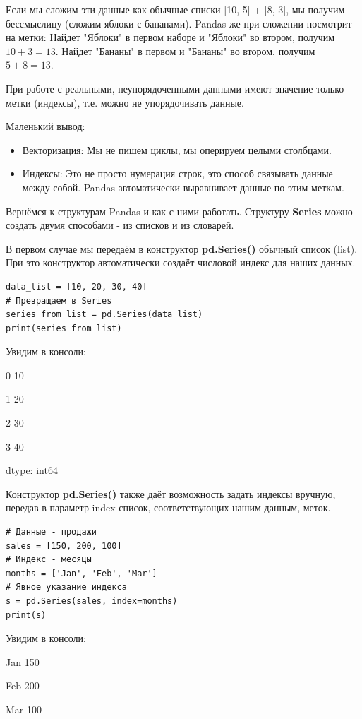 \documentclass[pract]{SCWorks}
\begin{document}
Если мы сложим эти данные как обычные списки [10, 5] + [8, 3], мы получим бессмыслицу 
(сложим яблоки с бананами). Pandas же при сложении посмотрит на метки:
Найдет "Яблоки" в первом наборе и "Яблоки" во втором, получим $10+3=13$.
Найдет "Бананы" в первом и "Бананы" во втором, получим $5+8=13$.

При работе с реальными, неупорядоченными данными имеют значение только метки (индексы), т.е. 
можно не упорядочивать данные.

Маленький вывод:

\begin{itemize}
    \item Векторизация: Мы не пишем циклы, мы оперируем целыми столбцами.
    \item Индексы: Это не просто нумерация строк, это способ связывать данные между собой. 
    Pandas автоматически выравнивает данные по этим меткам.
\end{itemize}

Вернёмся к структурам Pandas и как с ними работать.
Структуру \textbf{Series} можно создать двумя способами - из списков и из словарей.

В первом случае мы передаём в конструктор \textbf{pd.Series()} обычный список (list). При это 
конструктор автоматически создаёт числовой индекс для наших данных.

\begin{verbatim}
data_list = [10, 20, 30, 40]
# Превращаем в Series
series_from_list = pd.Series(data_list)
print(series_from_list)
\end{verbatim}
Увидим в консоли:

0   10

1   20

2   30

3   40

dtype: int64

Конструктор \textbf{pd.Series()} также даёт возможность задать индексы вручную, передав в параметр index
список, соответствующих нашим данным, меток.

\begin{verbatim}
# Данные - продажи
sales = [150, 200, 100]
# Индекс - месяцы
months = ['Jan', 'Feb', 'Mar']
# Явное указание индекса
s = pd.Series(sales, index=months)
print(s)
\end{verbatim}
Увидим в консоли:

Jan    150

Feb    200

Mar    100
\end{document}
